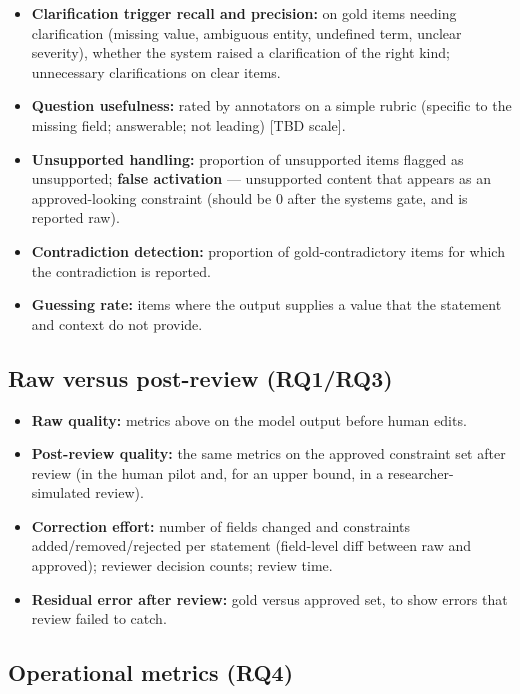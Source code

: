 \documentclass[
  11pt,a4paper,oneside]{report}
\providecommand{\tightlist}{%
  \setlength{\itemsep}{0pt}\setlength{\parskip}{0pt}}
\begin{document}
\begin{itemize}
\tightlist
\item
  \textbf{Clarification trigger recall and precision:} on gold items
  needing clarification (missing value, ambiguous entity, undefined
  term, unclear severity), whether the system raised a clarification of
  the right kind; unnecessary clarifications on clear items.
\item
  \textbf{Question usefulness:} rated by annotators on a simple rubric
  (specific to the missing field; answerable; not leading) {[}TBD
  scale{]}.
\item
  \textbf{Unsupported handling:} proportion of unsupported items flagged
  as unsupported; \textbf{false activation} --- unsupported content that
  appears as an approved-looking constraint (should be 0 after the
  system\textquotesingle s gate, and is reported raw).
\item
  \textbf{Contradiction detection:} proportion of gold-contradictory
  items for which the contradiction is reported.
\item
  \textbf{Guessing rate:} items where the output supplies a value that
  the statement and context do not provide.
\end{itemize}

\hypertarget{raw-versus-post-review-rq1rq3}{%
\subsection{Raw versus post-review
(RQ1/RQ3)}\label{raw-versus-post-review-rq1rq3}}

\begin{itemize}
\tightlist
\item
  \textbf{Raw quality:} metrics above on the model output before human
  edits.
\item
  \textbf{Post-review quality:} the same metrics on the approved
  constraint set after review (in the human pilot and, for an upper
  bound, in a researcher-simulated review).
\item
  \textbf{Correction effort:} number of fields changed and constraints
  added/removed/rejected per statement (field-level diff between raw and
  approved); reviewer decision counts; review time.
\item
  \textbf{Residual error after review:} gold versus approved set, to
  show errors that review failed to catch.
\end{itemize}

\hypertarget{operational-metrics-rq4}{%
\subsection{Operational metrics (RQ4)}\label{operational-metrics-rq4}}
\end{document}
